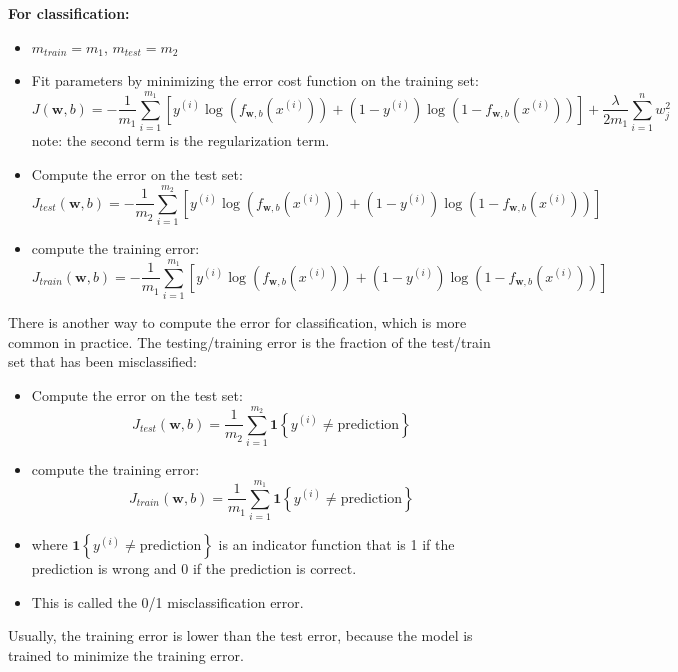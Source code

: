 \par
\textbf{For classification:}
\begin{itemize}
    \item $m_{train} = m_1$, $m_{test} = m_2$
    \item Fit parameters by minimizing the error cost function on the training set:
    \[ J(\mathbf{w}, b) = -\frac{1}{m_1} \sum_{i=1}^{m_1} \left[y^{(i)}\log\left(f_{\mathbf{w}, b}(x^{(i)})\right) + (1-y^{(i)})\log\left(1-f_{\mathbf{w}, b}(x^{(i)})\right)\right]
    + \frac{\lambda}{2m_1}\sum_{i=1}^{n}w_j^2\]
    note: the second term is the regularization term.
    \item Compute the error on the test set:
    \[ J_{test}(\mathbf{w}, b) = -\frac{1}{m_2} \sum_{i=1}^{m_2} \left[y^{(i)}\log\left(f_{\mathbf{w}, b}(x^{(i)})\right) + (1-y^{(i)})\log\left(1-f_{\mathbf{w}, b}(x^{(i)})\right)\right] \]
    \item compute the training error:
    \[ J_{train}(\mathbf{w}, b) = -\frac{1}{m_1} \sum_{i=1}^{m_1} \left[y^{(i)}\log\left(f_{\mathbf{w}, b}(x^{(i)})\right) + (1-y^{(i)})\log\left(1-f_{\mathbf{w}, b}(x^{(i)})\right)\right] \]
\end{itemize}
\par
\begin{notebox}
    \hspace{2em}There is another way to compute the error for classification, which is more common in practice. 
    The testing/training error is the fraction of the test/train set that has been misclassified:
    \begin{itemize}
        \item Compute the error on the test set:
        \[ J_{test}(\mathbf{w}, b) = \frac{1}{m_2} \sum_{i=1}^{m_2} \mathbf{1}\left\{y^{(i)} \neq \text{prediction}\right\} \]
        \item compute the training error:
        \[ J_{train}(\mathbf{w}, b) = \frac{1}{m_1} \sum_{i=1}^{m_1} \mathbf{1}\left\{y^{(i)} \neq \text{prediction}\right\} \]
        \item[] where $\mathbf{1}\left\{y^{(i)} \neq \text{prediction}\right\}$ is an indicator function that is 1 if the prediction is wrong and 0 if the prediction is correct.
        \item[] This is called the 0/1 misclassification error.
    \end{itemize}
\end{notebox}
\par
Usually, the training error is lower than the test error, because the model is trained to minimize the training error.
